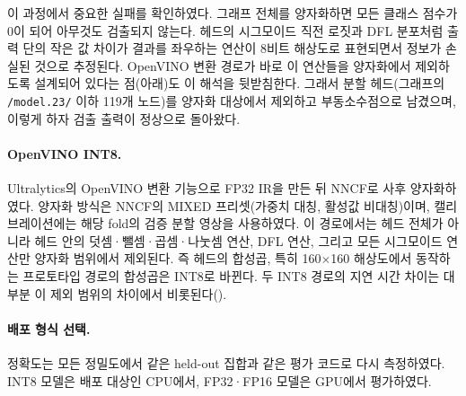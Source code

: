 이 과정에서 중요한 실패를 확인하였다. 그래프 전체를 양자화하면 모든 클래스 점수가 0이 되어 아무것도
검출되지 않는다. 헤드의 시그모이드 직전 로짓과 DFL 분포처럼 출력 단의 작은 값 차이가 결과를 좌우하는
연산이 8비트 해상도로 표현되면서 정보가 손실된 것으로 추정된다. OpenVINO 변환 경로가 바로 이 연산들을
양자화에서 제외하도록 설계되어 있다는 점(아래)도 이 해석을 뒷받침한다. 그래서 분할 헤드(그래프의
\texttt{/model.23/} 이하 119개 노드)를 양자화 대상에서 제외하고 부동소수점으로 남겼으며, 이렇게 하자
검출 출력이 정상으로 돌아왔다.

\paragraph{OpenVINO INT8.} Ultralytics의 OpenVINO 변환 기능으로 FP32 IR을 만든 뒤 NNCF\citep{kozlov2020nncf}로
사후 양자화하였다. 양자화 방식은 NNCF의 MIXED 프리셋(가중치 대칭, 활성값 비대칭)이며, 캘리브레이션에는
해당 fold의 검증 분할 영상을 사용하였다. 이 경로에서는 헤드 전체가 아니라 헤드 안의 덧셈·뺄셈·곱셈·나눗셈
연산, DFL 연산, 그리고 모든 시그모이드 연산만 양자화 범위에서 제외된다. 즉 헤드의 합성곱, 특히 160$\times$160
해상도에서 동작하는 프로토타입 경로의 합성곱은 INT8로 바뀐다. 두 INT8 경로의 지연 시간 차이는 대부분
이 제외 범위의 차이에서 비롯된다().

\paragraph{배포 형식 선택.} 정확도는 모든 정밀도에서 같은 held-out 집합과 같은 평가 코드로 다시 측정하였다.
INT8 모델은 배포 대상인 CPU에서, FP32·FP16 모델은 GPU에서 평가하였다.
